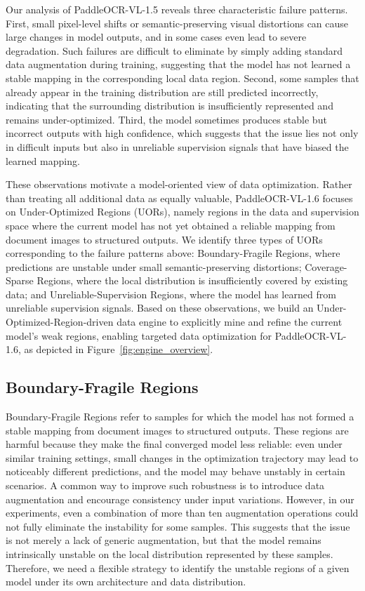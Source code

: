 \documentclass[11pt, a4paper,logo,  copyright, nonumbering]{paddleocr}
\begin{document}
Our analysis of PaddleOCR-VL-1.5 reveals three characteristic failure patterns. First, small pixel-level shifts or semantic-preserving visual distortions can cause large changes in model outputs, and in some cases even lead to severe degradation. Such failures are difficult to eliminate by simply adding standard data augmentation during training, suggesting that the model has not learned a stable mapping in the corresponding local data region. Second, some samples that already appear in the training distribution are still predicted incorrectly, indicating that the surrounding distribution is insufficiently represented and remains under-optimized. Third, the model sometimes produces stable but incorrect outputs with high confidence, which suggests that the issue lies not only in difficult inputs but also in unreliable supervision signals that have biased the learned mapping.

These observations motivate a model-oriented view of data optimization. Rather than treating all additional data as equally valuable, PaddleOCR-VL-1.6 focuses on Under-Optimized Regions (UORs), namely regions in the data and supervision space where the current model has not yet obtained a reliable mapping from document images to structured outputs. We identify three types of UORs corresponding to the failure patterns above: Boundary-Fragile Regions, where predictions are unstable under small semantic-preserving distortions; Coverage-Sparse Regions, where the local distribution is insufficiently covered by existing data; and Unreliable-Supervision Regions, where the model has learned from unreliable supervision signals. Based on these observations, we build an Under-Optimized-Region-driven data engine to explicitly mine and refine the current model's weak regions, enabling targeted data optimization for PaddleOCR-VL-1.6, as depicted in Figure~\ref{fig:engine_overview}.

\subsection{Boundary-Fragile Regions}

Boundary-Fragile Regions refer to samples for which the model has not formed a stable mapping from document images to structured outputs. These regions are harmful because they make the final converged model less reliable: even under similar training settings, small changes in the optimization trajectory may lead to noticeably different predictions, and the model may behave unstably in certain scenarios. A common way to improve such robustness is to introduce data augmentation and encourage consistency under input variations. However, in our experiments, even a combination of more than ten augmentation operations could not fully eliminate the instability for some samples. This suggests that the issue is not merely a lack of generic augmentation, but that the model remains intrinsically unstable on the local distribution represented by these samples. Therefore, we need a flexible strategy to identify the unstable regions of a given model under its own architecture and data distribution.
\end{document}
